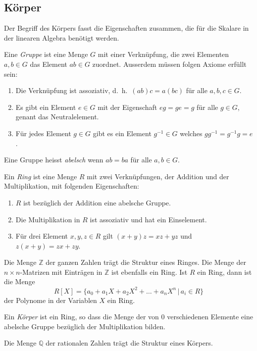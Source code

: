 %
%
\subsection{Körper}
Der Begriff des Körpers fasst die Eigenschaften zusammen, die für
die Skalare in der linearen Algebra benötigt werden.

Eine {\em Gruppe} ist eine Menge $G$ mit einer Verknüpfung, die zwei Elementen
$a,b\in G$ das Element $ab\in G$ zuordnet.
Ausserdem müssen folgen Axiome erfüllt sein:
\begin{enumerate}[label={\bf G.\arabic*},itemsep=0mm]
\item
Die Verknüpfung ist assoziativ, d.~h.~$(ab)c=a(bc)$ für alle $a,b,c\in G$.
\item
Es gibt ein Element $e\in G$ mit der Eigenschaft $eg=ge=g$ für alle $g\in G$,
genant das Neutralelement.
\item
Für jedes Element $g\in G$ gibt es ein Element $g^{-1}\in G$ welches
$gg^{-1}=g^{-1}g=e$.
\end{enumerate}
Eine Gruppe heisst {\em abelsch} wenn $ab=ba$ für alle $a,b\in G$.

Ein {\em Ring} ist eine Menge $R$ mit zwei Verknüpfungen, der Addition
und der Multiplikation, mit folgenden Eigenschaften:
\begin{enumerate}[label={\bf R.\arabic*},itemsep=0mm]
\item $R$ ist bezüglich der Addition eine abelsche Gruppe.
\item Die Multiplikation in $R$ ist assoziativ und hat ein Einselement.
\item Für drei Element $x,y,z\in R$ gilt $(x+y)z=xz+yz$ und
$z(x+y)=zx+zy$.
\end{enumerate}

Die Menge $\mathbb Z$ der ganzen Zahlen trägt die Struktur eines Ringes.
Die Menge der $n\times n$-Matrizen mit Einträgen in $\mathbb Z$ ist ebenfalls
ein Ring.
Ist $R$ ein Ring, dann ist die Menge 
\[
R[X]=\{ a_0+a_1X +a_2X^2+\dots +a_nX^n\,|\,a_i\in R\}
\]
der Polynome in der Variablen $X$ ein Ring.

Ein {\em Körper} ist ein Ring, so dass die Menge der von $0$ verschiedenen
Elemente eine abelsche Gruppe bezüglich der Multiplikation bilden.

Die Menge $\mathbb Q$ der rationalen Zahlen trägt die Struktur eines
Körpers.

%
%
